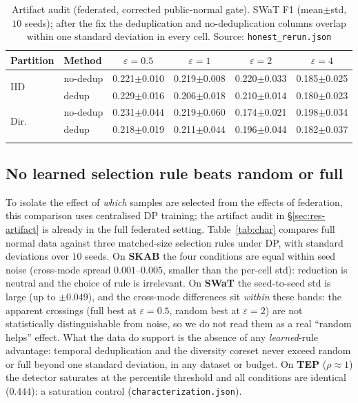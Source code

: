 \documentclass[pdflatex,sn-mathphys-num]{sn-jnl}
\theoremstyle{thmstyleone}
\theoremstyle{thmstyletwo}
\theoremstyle{thmstylethree}
\begin{document}
\begin{table}[t]
\centering
\caption{Artifact audit (federated, corrected public-normal gate). SWaT F1
(mean$\pm$std, $10$ seeds); after the fix the deduplication and no-deduplication
columns overlap within one standard deviation in every cell. Source:
\texttt{honest\_rerun.json}}\label{tab:artifact}
\setlength{\tabcolsep}{3.5pt}
\begin{tabular}{@{}llcccc@{}}
\toprule
Partition & Method & $\varepsilon{=}0.5$ & $\varepsilon{=}1$ & $\varepsilon{=}2$ & $\varepsilon{=}4$ \\
\midrule
\multirow{2}{*}{IID} & no-dedup & 0.221$\pm$0.010 & 0.219$\pm$0.008 & 0.220$\pm$0.033 & 0.185$\pm$0.025 \\
 & dedup & 0.229$\pm$0.016 & 0.206$\pm$0.018 & 0.210$\pm$0.014 & 0.180$\pm$0.023 \\
\midrule
\multirow{2}{*}{Dir.} & no-dedup & 0.231$\pm$0.044 & 0.219$\pm$0.060 & 0.174$\pm$0.021 & 0.198$\pm$0.034 \\
 & dedup & 0.218$\pm$0.019 & 0.211$\pm$0.044 & 0.196$\pm$0.044 & 0.182$\pm$0.037 \\
\botrule
\end{tabular}
\end{table}

\subsection{No learned selection rule beats random or full}\label{sec:res-selection}
To isolate the effect of \emph{which} samples are selected from the effects of
federation, this comparison uses centralised DP training; the artifact audit in
\S\ref{sec:res-artifact} is already in the full federated setting.
Table~\ref{tab:char} compares full normal data against three matched-size
selection rules under DP, with standard deviations over $10$ seeds. On \textbf{SKAB}
the four conditions are equal within seed noise (cross-mode spread
$0.001$--$0.005$, smaller than the per-cell std): reduction is neutral and the
choice of rule is irrelevant. On \textbf{SWaT} the seed-to-seed std is large (up to
$\pm0.049$), and the cross-mode differences sit \emph{within} these bands: the
apparent crossings (full best at $\varepsilon{=}0.5$, random best at
$\varepsilon{=}2$) are not statistically distinguishable from noise, so we do not
read them as a real ``random helps'' effect. What the data do support is the absence
of any \emph{learned}-rule advantage: temporal deduplication
and the diversity coreset never exceed random or full beyond one standard deviation,
in any dataset or budget. On \textbf{TEP} ($\rho\approx1$) the detector saturates at
the percentile threshold and all conditions are identical ($0.444$): a saturation
control (\texttt{characterization.json}).
\end{document}
